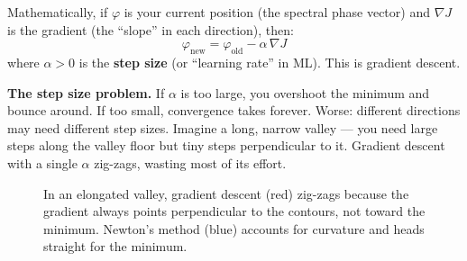 \documentclass[12pt,a4paper]{article}
\begin{document}
Mathematically, if $\varphi$ is your current position (the spectral phase vector) and $\nabla J$ is the gradient (the ``slope'' in each direction), then:
\begin{equation}
\varphi_{\text{new}} = \varphi_{\text{old}} - \alpha\,\nabla J
\label{eq:gd}
\end{equation}
where $\alpha > 0$ is the \textbf{step size} (or ``learning rate'' in ML). This is gradient descent.

\begin{warning}
\textbf{The step size problem.} If $\alpha$ is too large, you overshoot the minimum and bounce around. If too small, convergence takes forever. Worse: different directions may need different step sizes. Imagine a long, narrow valley --- you need large steps along the valley floor but tiny steps perpendicular to it. Gradient descent with a single $\alpha$ zig-zags, wasting most of its effort.
\end{warning}

\begin{figure}[H]
\centering
{}
\caption{In an elongated valley, gradient descent (red) zig-zags because the gradient always points perpendicular to the contours, not toward the minimum. Newton's method (blue) accounts for curvature and heads straight for the minimum.}
\label{fig:zigzag}
\end{figure}
\end{document}
